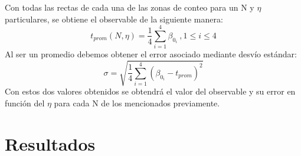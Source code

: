 \documentclass[11pt]{article}
\begin{document}
            Con todas las rectas de cada una de las zonas de conteo para un N y $\eta$ particulares, se obtiene el observable
            de la siguiente manera:
            \begin{equation}
                t_{prom}(N,\eta) = \frac{1}{4} \sum_{i=1}^{4} \beta_{0_i}\ , 1 \leq i \leq 4
            \end{equation}
            Al ser un promedio debemos obtener el error asociado mediante desvío estándar:
            \begin{equation}
                \sigma = \sqrt{\frac{1}{4} \sum_{i=1}^{4} (\beta_{0_i} - t_{prom})^2}
            \end{equation}
            Con estos dos valores obtenidos se obtendrá el valor del observable y su error en función del $\eta$ para cada N de los mencionados previamente.

    \newpage

    \section{Resultados}
\end{document}
